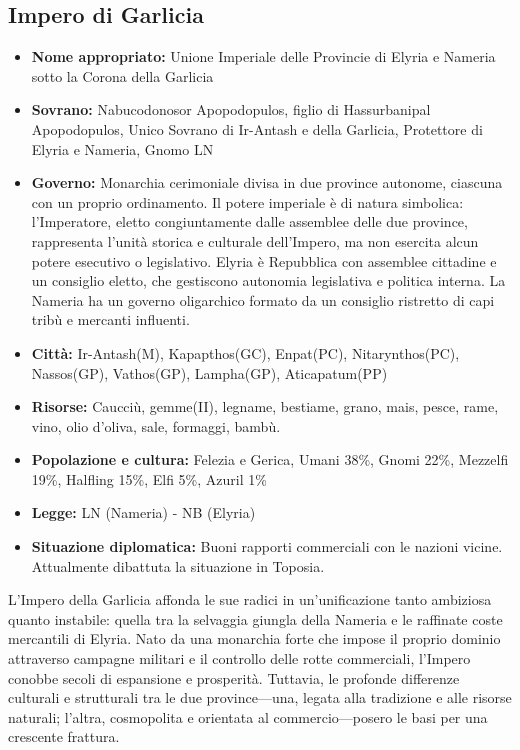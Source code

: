 \documentclass[10pt, a4paper]{report}
\begin{document}
\begin{multicols}{2}
\subsection*{Impero di Garlicia}
\begin{itemize}
	\item \textbf{Nome appropriato:} Unione Imperiale delle Provincie di Elyria e Nameria sotto la Corona della Garlicia
	\item \textbf{Sovrano:} Nabucodonosor Apopodopulos, figlio di Hassurbanipal Apopodopulos, Unico Sovrano di Ir-Antash e della Garlicia, Protettore di Elyria e Nameria, Gnomo LN 
	\item \textbf{Governo:} Monarchia cerimoniale divisa in due province autonome, ciascuna con un proprio ordinamento. Il potere imperiale è di natura simbolica: l’Imperatore, eletto congiuntamente dalle assemblee delle due province, rappresenta l’unità storica e culturale dell’Impero, ma non esercita alcun potere esecutivo o legislativo. Elyria è Repubblica con assemblee cittadine e un consiglio eletto, che gestiscono autonomia legislativa e politica interna. La Nameria ha un governo oligarchico formato da un consiglio ristretto di capi tribù e mercanti influenti.
	\item \textbf{Città:} Ir-Antash(M), Kapapthos(GC), Enpat(PC), Nitarynthos(PC), Nassos(GP), Vathos(GP), Lampha(GP), Aticapatum(PP)
	\item \textbf{Risorse:} Caucciù, gemme(II), legname, bestiame, grano, mais, pesce, rame, vino, olio d'oliva, sale, formaggi, bambù.
	\item \textbf{Popolazione e cultura:} Felezia e Gerica, Umani 38\%, Gnomi 22\%, Mezzelfi 19\%, Halfling 15\%, Elfi 5\%, Azuril 1\% 
	\item \textbf{Legge:} LN (Nameria) - NB (Elyria)
	\item \textbf{Situazione diplomatica:} Buoni rapporti commerciali con le nazioni vicine. Attualmente dibattuta la situazione in Toposia.
\end{itemize}
L’Impero della Garlicia affonda le sue radici in un’unificazione tanto ambiziosa quanto instabile: quella tra la selvaggia giungla della Nameria e le raffinate coste mercantili di Elyria. Nato da una monarchia forte che impose il proprio dominio attraverso campagne militari e il controllo delle rotte commerciali, l’Impero conobbe secoli di espansione e prosperità. Tuttavia, le profonde differenze culturali e strutturali tra le due province—una, legata alla tradizione e alle risorse naturali; l’altra, cosmopolita e orientata al commercio—posero le basi per una crescente frattura.

\end{multicols}
\end{document}
